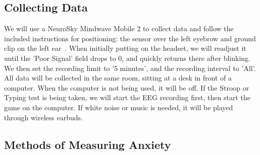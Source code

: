 \documentclass[journal]{IEEEtran}
\begin{document}
\subsection{Collecting Data}

We will use a NeuroSky Mindwave Mobile 2 to collect data and follow the included instructions for positioning: the sensor over the left eyebrow and ground clip on the left ear~\cite{neuroskyNeuroSkyMindWaveMobile2018}. When initially putting on the headset, we will readjust it until the 'Poor Signal' field drops to 0, and quickly returns there after blinking. We then set the recording limit to '5 minutes', and the recording interval to 'All'. All data will be collected in the same room, sitting at a desk in front of a computer. When the computer is not being used, it will be off. If the Stroop or Typing test is being taken, we will start the EEG recording first, then start the game on the computer. If white noise or music is needed, it will be played through wireless earbuds.

\subsection{Methods of Measuring Anxiety}
\end{document}
